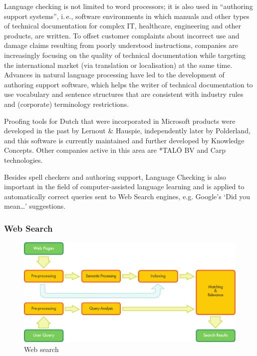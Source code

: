 \documentclass[]{../../metanetpaper}
\begin{document}
\begin{multicols}{2}
Language checking is not limited to word processors; it is also used in “authoring support systems”, i.\,e., software environments in which manuals and other types of technical documentation for complex IT, healthcare, engineering and other products, are written. To offset customer complaints about incorrect use and damage claims resulting from poorly understood instructions, companies are increasingly focusing on the quality of technical documentation while targeting the international market (via translation or localisation) at the same time. Advances in natural language processing have led to the development of authoring support software, which helps the writer of technical documentation to use vocabulary and sentence structures that are consistent with industry rules and (corporate) terminology restrictions.


Proofing tools for Dutch that were incorporated in Microsoft products were developed in the past by Lernout \& Hauspie, independently later by Polderland, and this software is currently maintained and further developed by Knowledge Concepts.  Other companies active in this area are *TAL{\=O} BV and Carp technologies.

    Besides spell checkers and authoring support, Language Checking is also important in the field of computer-assisted language learning and is applied to automatically correct queries sent to Web Search engines, e.g. Google's `Did you mean\dots' suggestions.


\subsubsection{Web Search}

\begin{figure}[htb]
  \center
  \includegraphics[width=\textwidth]{../_media/english/web_search_architecture}
  \caption{Web search}
  \label{fig:websearcharch_en}
 \end{figure}


\end{multicols}
\end{document}
